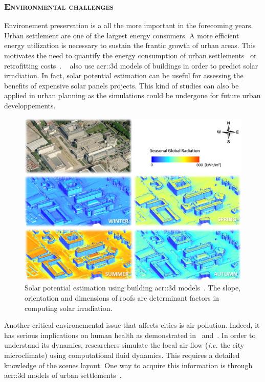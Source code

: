         \subsubsection{\textsc{Environmental challenges}}
            Environement preservation is a all the more important in the forecoming years.
            Urban settlement are one of the largest energy consumers.
            A more efficient energy utilization is necessary to sustain the frantic growth of urban areas.
            This motivates the need to quantify the energy consumption of urban settlements~\parencite{WATE20153372} or retrofitting costs~\parencite{previtali2014automatic}.
            ~\textcite{biljecki2015propagation} also use \gls{acr::3d} models of buildings in order to predict solar irradiation.
            In fact, solar potential estimation can be useful for assessing the benefits of expensive solar panels projects.
            This kind of studies can also be applied in urban planning as the simulations could be undergone for future urban developpements.\\
            \begin{figure}[htpb]
                \centering
                \includegraphics[width=.7\textwidth]{images/introduction/3d_model_applications/solar_potential}
                \caption{
                    \label{fig::solar_potential} Solar potential estimation using building \gls{acr::3d} models~\parencite{redweik2013solar}.
                    The slope, orientation and dimensions of roofs are determinant factors in computing solar irradiation.
                }
            \end{figure}
            Another critical environemental issue that affects cities is air pollution.
            Indeed, it has serious implications on human health as demonstrated in~\textcite{pascal2013assessing} and~\textcite{chen2013evidence}.
            In order to understand its dynamics, researchers simulate the local air flow (\textit{i.e.} the city microclimate) using computational fluid dynamics.
            This requires a detailed knowledge of the scenes layout.
            One way to acquire this information is through \gls{acr::3d} models of urban settlements~\parencite{ujang2013unified}.
       
